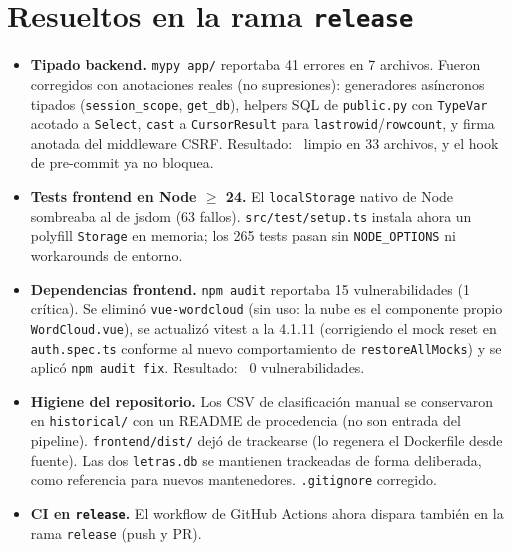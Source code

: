 \documentclass[11pt,letterpaper,twoside]{report}
\newcommand{\ok}{\textcolor{cenidim-vino}{\textbf{\checkmark}}}
\newcommand{\codigo}[1]{\texttt{#1}}
\begin{document}
\section{Resueltos en la rama \codigo{release}}
\label{sec:resueltos}
\begin{itemize}
  \item \textbf{Tipado backend.} \codigo{mypy app/} reportaba 41
        errores en 7 archivos. Fueron corregidos con anotaciones reales
        (no supresiones): generadores asíncronos tipados
        (\codigo{session\_scope}, \codigo{get\_db}), helpers SQL de
        \codigo{public.py} con \codigo{TypeVar} acotado a
        \codigo{Select}, \codigo{cast} a \codigo{CursorResult} para
        \codigo{lastrowid}/\codigo{rowcount}, y firma anotada del
        middleware CSRF. Resultado: \ok\ limpio en 33 archivos, y el
        hook de pre-commit ya no bloquea.
  \item \textbf{Tests frontend en Node $\ge$ 24.} El
        \codigo{localStorage} nativo de Node sombreaba al de jsdom (63
        fallos). \codigo{src/test/setup.ts} instala ahora un polyfill
        \codigo{Storage} en memoria; los 265 tests pasan sin
        \codigo{NODE\_OPTIONS} ni workarounds de entorno.
  \item \textbf{Dependencias frontend.} \codigo{npm audit} reportaba 15
        vulnerabilidades (1 crítica). Se eliminó \codigo{vue-wordcloud}
        (sin uso: la nube es el componente propio
        \codigo{WordCloud.vue}), se actualizó vitest a la 4.1.11
        (corrigiendo el mock reset en \codigo{auth.spec.ts} conforme al
        nuevo comportamiento de \codigo{restoreAllMocks}) y se aplicó
        \codigo{npm audit fix}. Resultado: \ok\ 0 vulnerabilidades.
  \item \textbf{Higiene del repositorio.} Los CSV de clasificación
        manual se conservaron en \codigo{historical/} con un README de
        procedencia (no son entrada del pipeline).
        \codigo{frontend/\allowbreak dist/} dejó de trackearse (lo
        regenera el Dockerfile desde fuente). Las dos
        \codigo{letras.db} se mantienen trackeadas de forma deliberada,
        como referencia para nuevos mantenedores. \codigo{.gitignore}
        corregido.
  \item \textbf{CI en \codigo{release}.} El workflow de GitHub Actions
        ahora dispara también en la rama \codigo{release} (push y PR).
\end{itemize}
\end{document}
